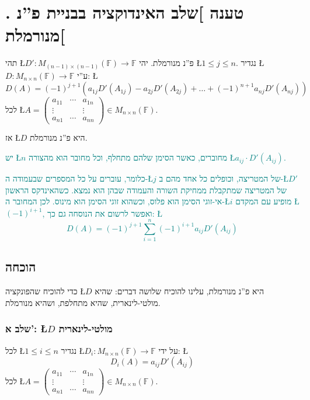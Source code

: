 \documentclass[english,hebrew]{article}
\begin{document}
\section{{\endL}. טענה {]}שלב האינדוקציה בבניית פ\textquotedblright נ
מנורמלת{[}}

תהי \L{$D':M_{(n-1)\times(n-1)}(\mathbb{F})\to\mathbb{F}$} פ\textquotedblright נ
מנורמלת. יהי \L{$1\le j\le n$}. נגדיר \L{$D:M_{n\times n}(\mathbb{F})\to\mathbb{F}$}
ע\textquotedblright י: \L{%
\[
D(A)=(-1)^{j+1}\left(a_{1j}D'(A_{1j})-a_{2j}D'(A_{2j})+\dots+(-1)^{n+1}a_{nj}D'(A_{nj})\right)
\]
}%
לכל \L{$A=\begin{pmatrix}a_{11} & \cdots & a_{1n}\\
\vdots &  & \vdots\\
a_{n1} & \cdots & a_{nn}
\end{pmatrix}\in M_{n\times n}(\mathbb{F})$}.

אז \L{$D$} היא פ\textquotedblright נ מנורמלת.

\medskip{}

\textcolor{teal}{יש \L{$n$} מחוברים, כאשר הסימן שלהם מתחלף, וכל מחובר
הוא מהצורה \L{$a_{ij}\cdot D'(A_{ij})$}. }

\textcolor{teal}{כלומר, עוברים על כל המספרים שבעמודה ה-\L{$j$} של
המטריצה, וכופלים כל אחד מהם ב-\L{$D'$} של המטריצה שמתקבלת ממחיקת
השורה והעמודה שבהן הוא נמצא. כשהאינדקס הראשון אי-זוגי הסימן הוא פלוס,
וכשהוא זוגי הסימן הוא מינוס. לכן המחובר ה-\L{$i$} מופיע עם המקדם
\L{$(-1)^{i+1}$}, ואפשר לרשום את הנוסחה גם כך: \L{%
\[
D(A)=(-1)^{j+1}\sum_{i=1}^{n}(-1)^{i+1}a_{ij}D'(A_{ij})
\]
}%
}

\subsection{הוכחה}

כדי להוכיח שהפונקציה \L{$D$} היא פ\textquotedblright נ מנורמלת, עלינו
להוכיח שלושה דברים: שהיא מולטי-לינארית, שהיא מתחלפת, ושהיא מנורמלת.

\subsubsection{שלב א': \L{$D$} מולטי-לינארית}

לכל \L{$1\le i\le n$} נגדיר \L{$D_{i}:M_{n\times n}(\mathbb{F})\to\mathbb{F}$}
על ידי: \L{%
\[
D_{i}(A)=a_{ij}D'(A_{ij})
\]
}%
לכל \L{$A=\begin{pmatrix}a_{11} & \cdots & a_{1n}\\
\vdots &  & \vdots\\
a_{n1} & \cdots & a_{nn}
\end{pmatrix}\in M_{n\times n}(\mathbb{F})$}.
\end{document}
